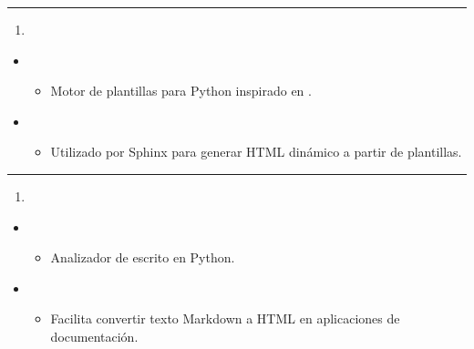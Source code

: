 \documentclass[a4paper,10pt,spanish]{sphinxmanual}
\begin{document}
\bigskip\hrule\bigskip

\begin{enumerate}
%
\setcounter{enumi}{8}
\item {} 
\sphinxAtStartPar
{}

\end{enumerate}
\begin{itemize}
\item {} 
\sphinxAtStartPar
{}
\begin{itemize}
\item {} 
\sphinxAtStartPar
Motor de plantillas para Python inspirado en .

\end{itemize}

\item {} 
\sphinxAtStartPar
{}
\begin{itemize}
\item {} 
\sphinxAtStartPar
Utilizado por Sphinx para generar HTML dinámico a partir de plantillas.

\end{itemize}

\end{itemize}


\bigskip\hrule\bigskip

\begin{enumerate}
%
\setcounter{enumi}{9}
\item {} 
\sphinxAtStartPar
{}

\end{enumerate}
\begin{itemize}
\item {} 
\sphinxAtStartPar
{}
\begin{itemize}
\item {} 
\sphinxAtStartPar
Analizador de  escrito en Python.

\end{itemize}

\item {} 
\sphinxAtStartPar
{}
\begin{itemize}
\item {} 
\sphinxAtStartPar
Facilita convertir texto Markdown a HTML en aplicaciones de documentación.

\end{itemize}

\end{itemize}
\end{document}
